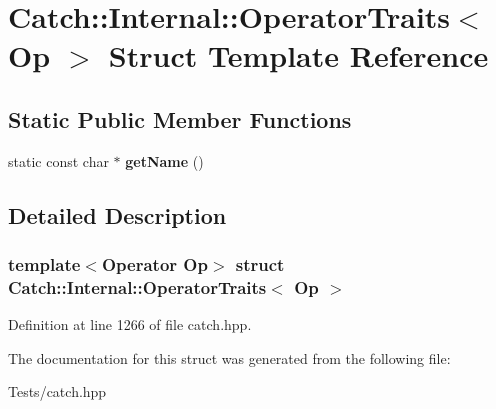 \hypertarget{struct_catch_1_1_internal_1_1_operator_traits}{}\section{Catch\+:\+:Internal\+:\+:Operator\+Traits$<$ Op $>$ Struct Template Reference}
\label{struct_catch_1_1_internal_1_1_operator_traits}
\subsection*{Static Public Member Functions}
\begin{DoxyCompactItemize}
\item 
\mbox{\label{struct_catch_1_1_internal_1_1_operator_traits_ac6d08082ea33348d42bc4ccbd6d07671}} 
static const char $\ast$ {\bfseries get\+Name} ()
\end{DoxyCompactItemize}


\subsection{Detailed Description}
\subsubsection*{template$<$Operator Op$>$\newline
struct Catch\+::\+Internal\+::\+Operator\+Traits$<$ Op $>$}



Definition at line 1266 of file catch.\+hpp.



The documentation for this struct was generated from the following file\+:\begin{DoxyCompactItemize}
\item 
Tests/catch.\+hpp\end{DoxyCompactItemize}
